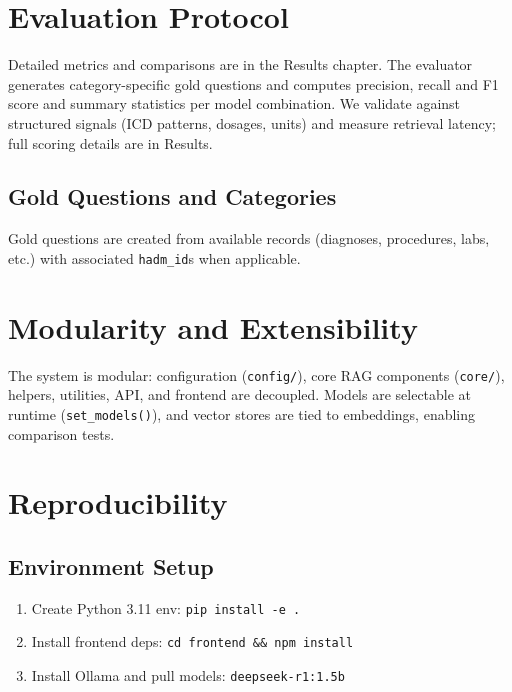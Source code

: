 \section{Evaluation Protocol}
Detailed metrics and comparisons are in the Results chapter.
The evaluator generates category-specific gold questions and computes precision, recall and F1 score and summary statistics per model combination. We validate against structured signals (ICD patterns, dosages, units) and measure retrieval latency; full scoring details are in Results.

\subsection{Gold Questions and Categories}
Gold questions are created from available records (diagnoses, procedures, labs, etc.) with associated \texttt{hadm\_id}s when applicable.

\section{Modularity and Extensibility}
The system is modular: configuration (\texttt{config/}), core RAG components (\texttt{core/}), helpers, utilities, API, and frontend are decoupled. Models are selectable at runtime (\texttt{set\_models()}), and vector stores are tied to embeddings, enabling comparison tests.

\section{Reproducibility}

\subsection{Environment Setup}
\begin{enumerate}
  \item Create Python 3.11 env: \texttt{pip install -e .}
  \item Install frontend deps: \texttt{cd frontend \&\& npm install}
  \item Install Ollama and pull models: \texttt{deepseek-r1:1.5b}
\end{enumerate}

